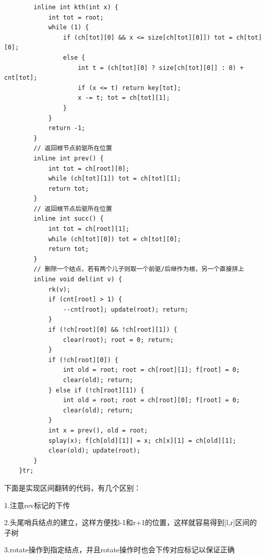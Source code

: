 \documentclass[a4paper,11pt,twoside,fontset = fandol,UTF8]{ctexbook} %
\begin{document}
\begin{lstlisting}
	    inline int kth(int x) {
	        int tot = root;
	        while (1) {
	            if (ch[tot][0] && x <= size[ch[tot][0]]) tot = ch[tot][0];
	            else {
	                int t = (ch[tot][0] ? size[ch[tot][0]] : 0) + cnt[tot];
	                if (x <= t) return key[tot];
	                x -= t; tot = ch[tot][1];
	            }
	        }
	        return -1;
	    }
	    // 返回根节点前驱所在位置
	    inline int prev() {
	        int tot = ch[root][0];
	        while (ch[tot][1]) tot = ch[tot][1];
	        return tot;
	    }
	    // 返回根节点后驱所在位置
	    inline int succ() {
	        int tot = ch[root][1];
	        while (ch[tot][0]) tot = ch[tot][0];
	        return tot;
	    }
	    // 删除一个结点，若有两个儿子则取一个前驱/后继作为根，另一个直接拼上
	    inline void del(int v) {
	        rk(v);
	        if (cnt[root] > 1) {
	            --cnt[root]; update(root); return;
	        }
	        if (!ch[root][0] && !ch[root][1]) {
	            clear(root); root = 0; return;
	        }
	        if (!ch[root][0]) {
	            int old = root; root = ch[root][1]; f[root] = 0;
	            clear(old); return;
	        } else if (!ch[root][1]) {
	            int old = root; root = ch[root][0]; f[root] = 0;
	            clear(old); return;
	        }
	        int x = prev(), old = root;
	        splay(x); f[ch[old][1]] = x; ch[x][1] = ch[old][1];
	        clear(old); update(root);
	    }
	}tr;
	\end{lstlisting}
	
	下面是实现区间翻转的代码，有几个区别：
	
	1.注意rev标记的下传
	
	2.头尾哨兵结点的建立，这样方便找l-1和r+1的位置，这样就容易得到[l,r]区间的子树
	
	3.rotate操作到指定结点，并且rotate操作时也会下传对应标记以保证正确
	
\end{document}
